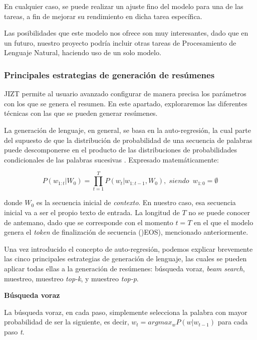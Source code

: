 
En cualquier caso, se puede realizar un ajuste fino del modelo para una de las tareas, a fin de mejorar su rendimiento en dicha tarea específica.

Las posibilidades que este modelo nos ofrece son muy interesantes, dado que en un futuro, nuestro proyecto podría incluir otras tareas de Procesamiento de Lenguaje Natural, haciendo uso de un solo modelo.


\bigskip
\subsubsection{Principales estrategias de generación de resúmenes}

JIZT permite al usuario avanzado configurar de manera precisa los parámetros con los que se genera el resumen. En este apartado, exploraremos las diferentes técnicas con las que se pueden generar resúmenes.

La generación de lenguaje, en general, se basa en la auto-regresión, la cual parte del supuesto de que la distribución de probabilidad de una secuencia de palabras puede descomponerse en el producto de las distribuciones de probabilidades  condicionales de las palabras sucesivas \cite{platen20}. Expresado matemáticamente:

\[ P(w_{1:t} | W_0) = \prod_{t=1}^{T} P(w_t | w_{1:t-1}, W_0), \; siendo \enspace w_{1:0} = \emptyset \]

donde $W_0$ es la secuencia inicial de \emph{contexto}. En nuestro caso, esa secuencia inicial va a ser el propio texto de entrada. La longitud de $T$ no se puede conocer de antemano, dado que se corresponde con el momento $t = T$ en el que el modelo genera el \emph{token} de finalización de secuencia ()EOS), mencionado anteriormente.

Una vez introducido el concepto de auto-regresión, podemos explicar brevemente las cinco	 principales estrategias de generación de lenguaje, las cuales se pueden aplicar todas ellas a la generación de resúmenes: búsqueda voraz, \emph{beam search}, muestreo, muestreo \emph{top-k}, y muestreo \emph{top-p}.

\bigskip
\noindent
\textbf{Búsqueda voraz}

La búsqueda voraz, en cada paso, simplemente selecciona la palabra con mayor probabilidad de ser la siguiente, es decir, $ w_t = argmax_w P(w|w_{t-1}) $ para cada paso \emph{t}.


